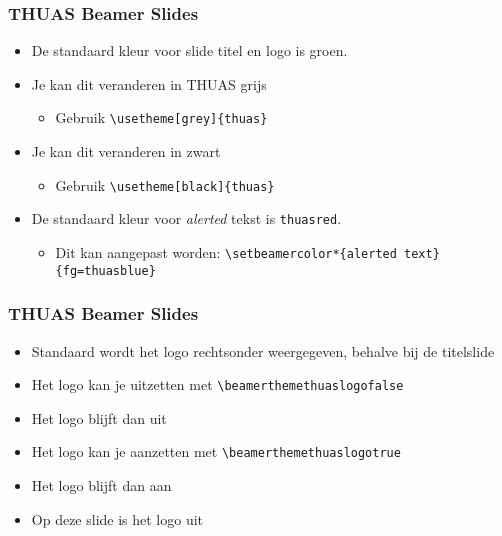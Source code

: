 \documentclass[fleqn,aspectratio=169,dutch,10pt]{beamer}
\begin{document}
\begin{frame}[fragile]
\frametitle{THUAS Beamer Slides}
\begin{itemize}
\item De standaard kleur voor slide titel en logo is groen.
\item Je kan dit veranderen in THUAS grijs
\begin{itemize}
\item Gebruik \lstinline|\usetheme[grey]{thuas}|
\end{itemize}
\item Je kan dit veranderen in zwart
\begin{itemize}
\item Gebruik \lstinline|\usetheme[black]{thuas}|
\end{itemize}
\item De standaard kleur voor \emph{alerted} tekst is \lstinline|thuasred|.
\begin{itemize}
\item Dit kan aangepast worden: \lstinline|\setbeamercolor*{alerted text}{fg=thuasblue}|
\end{itemize}
\end{itemize}
\end{frame}


\beamerthemethuaslogofalse

\begin{frame}[fragile]
\frametitle{THUAS Beamer Slides}
\begin{itemize}
\item Standaard wordt het logo rechtsonder weergegeven, behalve bij de titelslide
\item Het logo kan je uitzetten met \lstinline|\beamerthemethuaslogofalse|
\item Het logo blijft dan uit
\item Het logo kan je aanzetten met \lstinline|\beamerthemethuaslogotrue|
\item Het logo blijft dan aan
\item Op deze slide is het logo uit
\end{itemize}
\end{frame}

\beamerthemethuaslogotrue
\end{document}
